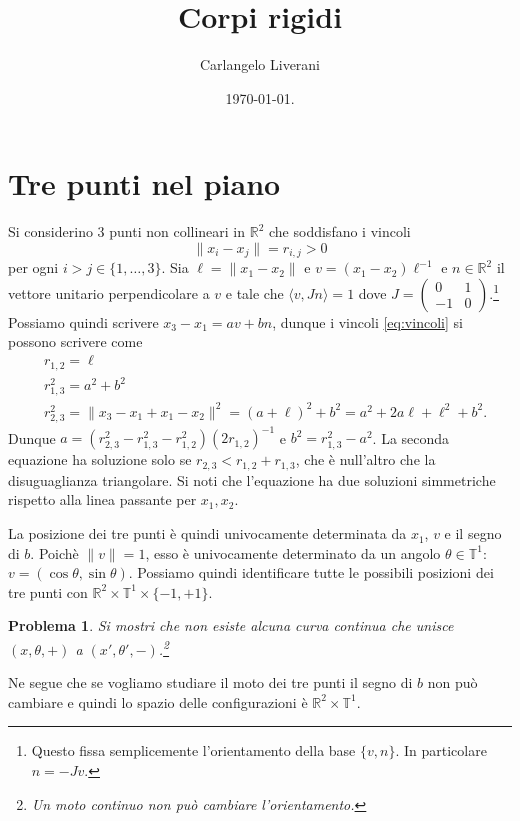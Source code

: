 \documentclass{amsart}
\numberwithin{equation}{section}
\newtheorem{pro}{Problema}
\newcommand\bR{{\mathbb R}}
\newcommand\bT{{\mathbb T}}
\begin{document}
\title{Corpi rigidi}
\author{Carlangelo Liverani}
\address{Carlangelo Liverani\\
Dipartimento di Matematica\\
II Universit\`{a} di Roma (Tor Vergata)\\
Via della Ricerca Scientifica, 00133 Roma, Italy.}
\date{\today.}
\maketitle




\section{Tre punti nel piano}
Si considerino $3$ punti non collineari in $\bR^2$ che soddisfano i vincoli
\begin{equation}\label{eq:vincoli0}
\|x_i-x_j\|=r_{i,j}>0
\end{equation}
per ogni $i>j\in \{1,\dots, 3\}$. Sia  $\ell=\|x_1-x_2\|$ e $v=(x_1- x_2)\ell^{-1}$ e $n\in\bR^2$ il vettore unitario perpendicolare a $v$ e tale che $\langle v,Jn\rangle=1$ dove $J=\begin{pmatrix}0&1\\-1&0\end{pmatrix}$.\footnote{ Questo fissa semplicemente l'orientamento della base $\{v,n\}$. In particolare $n=-Jv$.}
Possiamo quindi scrivere $x_3-x_1=av+bn$, dunque i vincoli \eqref{eq:vincoli} si possono scrivere come
\[
\begin{split}
&r_{1,2}=\ell\\
&r_{1,3}^2=a^2+b^2\\
&r_{2,3}^2=\|x_3-x_1+x_1-x_2\|^2=(a+\ell)^2+b^2=a^2+2a\ell+\ell^2+b^2.
\end{split}
\]
Dunque $a=(r_{2,3}^2-r_{1,3}^2-r_{1,2}^2)(2r_{1,2})^{-1}$ e $b^2=r_{1,3}^2-a^2$. La seconda equazione ha soluzione solo se $r_{2,3}< r_{1,2}+r_{1,3}$, che \`e null'altro che la disuguaglianza triangolare. Si noti che l'equazione ha due soluzioni simmetriche rispetto alla linea passante per $x_1, x_2$.

La posizione dei tre punti \`e quindi univocamente determinata da $x_1$, $v$ e il segno di $b$. Poich\`e $\|v\|=1$, esso \`e univocamente determinato da un angolo $\theta\in\bT^1$: $v=(\cos\theta,\sin\theta)$. Possiamo quindi identificare tutte le possibili posizioni dei tre punti con $\bR^2\times \bT^1\times \{-1,+1\}$.
\begin{pro} Si  mostri che non esiste alcuna curva continua che unisce $(x,\theta,+)$ a $(x',\theta',-)$.\footnote{ Un moto continuo non pu\`o cambiare l'orientamento.}
\end{pro}
Ne segue che se vogliamo  studiare il moto dei tre punti il segno di $b$ non pu\`o cambiare e quindi lo spazio delle configurazioni \`e $\bR^2\times \bT^1$.
\end{document}
